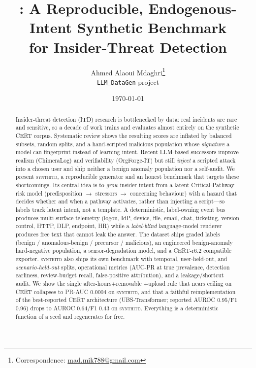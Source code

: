 \documentclass[11pt]{article}
\title{\textbf{\sys: A Reproducible, Endogenous-Intent Synthetic Benchmark\\
for Insider-Threat Detection}}
\author{
  Ahmed Alaoui Mdaghri\thanks{Correspondence: \href{mailto:mad.mik788@gmail.com}{mad.mik788@gmail.com}}\\
  \texttt{LLM\_DataGen} project
}
\date{\today}
\newcommand{\sys}{\textsc{synthitd}}
\begin{document}
\maketitle

\begin{abstract}
Insider-threat detection (ITD) research is bottlenecked by data: real incidents are
rare and sensitive, so a decade of work trains and evaluates almost entirely on the
synthetic CERT corpus. Systematic review shows the resulting scores are inflated by
balanced subsets, random splits, and a hand-scripted malicious population whose
\emph{signature} a model can fingerprint instead of learning intent. Recent
LLM-based successors improve realism (ChimeraLog) and verifiability (OrgForge-IT) but
still \emph{inject} a scripted attack into a chosen user and ship neither a benign
anomaly population nor a self-audit. We present \sys, a reproducible generator and an
honest benchmark that targets these shortcomings. Its central idea is to
\emph{grow} insider intent from a latent Critical-Pathway risk model
(predisposition $\rightarrow$ stressors $\rightarrow$ concerning behaviour) with a
hazard that decides whether and when a pathway activates, rather than injecting a
script---so labels track latent intent, not a template. A deterministic, label-owning
event bus produces multi-surface telemetry (logon, IdP, device, file, email, chat,
ticketing, version control, HTTP, DLP, endpoint, HR) while a \emph{label-blind}
language-model renderer produces free text that cannot leak the answer. The dataset
ships graded labels (benign / anomalous-benign / precursor / malicious), an engineered
benign-anomaly hard-negative population, a sensor-degradation model, and a CERT-r6.2
compatible exporter. \sys{} also ships its own benchmark with temporal,
user-held-out, and \emph{scenario-held-out} splits, operational metrics
(AUC-PR at true prevalence, detection earliness, review-budget recall, false-positive
attribution), and a leakage/shortcut audit. We show the single after-hours$+$removable
$+$upload rule that nears ceiling on CERT collapses to PR-AUC $0.0004$ on \sys{}, and
that a faithful reimplementation of the best-reported CERT architecture
(UBS-Transformer; reported AUROC $0.95$/F1 $0.96$) drops to AUROC $0.64$/F1 $0.43$ on
\sys. Everything is a deterministic function of a seed and regenerates for free.
\end{abstract}
\end{document}
